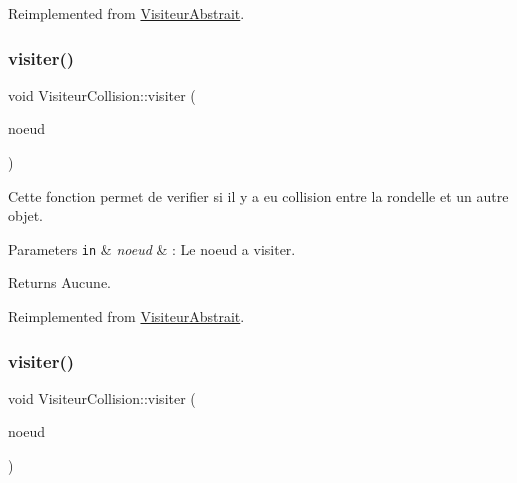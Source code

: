 Reimplemented from \hyperlink{class_visiteur_abstrait}{Visiteur\+Abstrait}.

\hypertarget{class_visiteur_collision_ad679b2bdfe4bc0105ff638ddb5f447cc}{}\label{class_visiteur_collision_ad679b2bdfe4bc0105ff638ddb5f447cc} 
\subsubsection{\texorpdfstring{visiter()}{visiter()}\hspace{0.1cm}{\footnotesize\ttfamily [6/8]}}
{\footnotesize\ttfamily void Visiteur\+Collision\+::visiter (\begin{DoxyParamCaption}\item[{\hyperlink{class_noeud_rondelle}{Noeud\+Rondelle} $\ast$}]{noeud }\end{DoxyParamCaption})\hspace{0.3cm}{\ttfamily [virtual]}}

Cette fonction permet de verifier si il y a eu collision entre la rondelle et un autre objet.


\begin{DoxyParams}[1]{Parameters}
\mbox{\tt in}  & {\em noeud} & \+: Le noeud a visiter.\\
\hline
\end{DoxyParams}
\begin{DoxyReturn}{Returns}
Aucune. 
\end{DoxyReturn}


Reimplemented from \hyperlink{class_visiteur_abstrait}{Visiteur\+Abstrait}.

\hypertarget{class_visiteur_collision_ab071b0f0b2d05d622c4698a652f19e77}{}\label{class_visiteur_collision_ab071b0f0b2d05d622c4698a652f19e77} 
\subsubsection{\texorpdfstring{visiter()}{visiter()}\hspace{0.1cm}{\footnotesize\ttfamily [7/8]}}
{\footnotesize\ttfamily void Visiteur\+Collision\+::visiter (\begin{DoxyParamCaption}\item[{\hyperlink{class_noeud_table}{Noeud\+Table} $\ast$}]{noeud }\end{DoxyParamCaption})\hspace{0.3cm}{\ttfamily [virtual]}}

